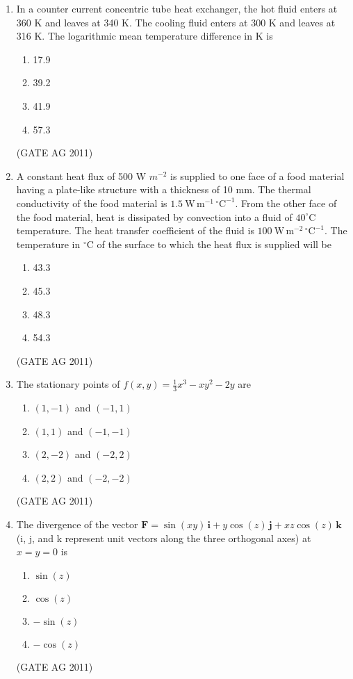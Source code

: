 \documentclass[journal,12pt,onecolumn]{IEEEtran}
\theoremstyle{remark}
\begin{document}
\begin{enumerate}
\item In a counter current concentric tube heat exchanger, the hot fluid enters at 360 K and leaves at 340 K. 
The cooling fluid enters at 300 K and leaves at 316 K. The logarithmic mean temperature difference in K is
\begin{multicols}{4}
\begin{enumerate}
\item 17.9
\item 39.2
\item 41.9
\item 57.3
\end{enumerate}
\end{multicols}
\hfill{(GATE AG 2011)}

\item A constant heat flux of 500 W ${m^{-2}}$ is supplied to one face of a food material having a plate-like structure with a thickness of 10 mm. 
The thermal conductivity of the food material is $1.5\ \mathrm{W\,m^{-1}\,^\circ C^{-1}}$. 
From the other face of the food material, heat is dissipated by convection into a fluid of $40^\circ\mathrm{C}$ temperature. 
The heat transfer coefficient of the fluid is $100\ \mathrm{W\,m^{-2}\,^\circ C^{-1}}$. 
The temperature in $^\circ\mathrm{C}$ of the surface to which the heat flux is supplied will be
\begin{multicols}{4}
\begin{enumerate}
\item 43.3
\item 45.3
\item 48.3
\item 54.3
\end{enumerate}
\end{multicols}
\hfill{(GATE AG 2011)}

\item The stationary points of $f(x,y) = \frac13 x^3 - xy^2 - 2y$ are
\begin{multicols}{4}
\begin{enumerate}
\item $(1,-1)$ and $(-1,1)$
\item $(1,1)$ and $(-1,-1)$
\item $(2,-2)$ and $(-2,2)$
\item $(2,2)$ and $(-2,-2)$
\end{enumerate}
\end{multicols}
\hfill{(GATE AG 2011)}

\item The divergence of the vector $\mathbf{F} = \sin(xy)\,\mathbf{i} + y\cos(z)\,\mathbf{j} + xz\cos(z)\,\mathbf{k}$ 
(i, j, and k represent unit vectors along the three orthogonal axes) at $x = y = 0$ is
\begin{multicols}{4}
\begin{enumerate}
\item $\sin(z)$
\item $\cos(z)$
\item $-\sin(z)$
\item $-\cos(z)$
\end{enumerate}
\end{multicols}
\hfill{(GATE AG 2011)}


\end{enumerate}
\end{document}
